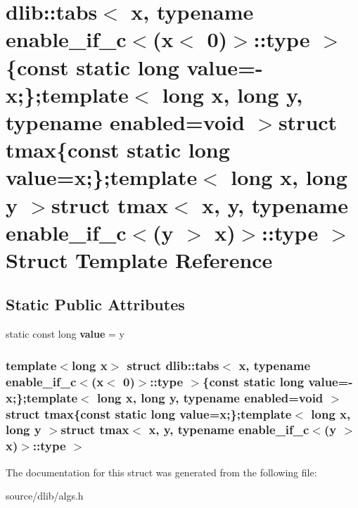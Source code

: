 \hypertarget{structdlib_1_1tabs_3_01x_00_01typename_01enable__if__c_3_07x_3_010_08_4_1_1type_01_4_02const_01s5583e8a7aa9817e380d6b80c74f287b0}{
\section{dlib::tabs$<$ x, typename enable\_\-if\_\-c$<$(x$<$ 0)$>$::type $>$\{const static long value=-\/x;\};template$<$ long x, long y, typename enabled=void $>$struct tmax\{const static long value=x;\};template$<$ long x, long y $>$struct tmax$<$ x, y, typename enable\_\-if\_\-c$<$(y $>$ x)$>$::type $>$ Struct Template Reference}
\label{structdlib_1_1tabs_3_01x_00_01typename_01enable__if__c_3_07x_3_010_08_4_1_1type_01_4_02const_01s5583e8a7aa9817e380d6b80c74f287b0}
}
\subsection*{Static Public Attributes}
\begin{DoxyCompactItemize}
\item 
\hypertarget{structdlib_1_1tabs_3_01x_00_01typename_01enable__if__c_3_07x_3_010_08_4_1_1type_01_4_02const_01s5583e8a7aa9817e380d6b80c74f287b0_a51dbbdc71ec5aecb391194f232164d98}{
static const long {\bfseries value} = y}
\label{structdlib_1_1tabs_3_01x_00_01typename_01enable__if__c_3_07x_3_010_08_4_1_1type_01_4_02const_01s5583e8a7aa9817e380d6b80c74f287b0_a51dbbdc71ec5aecb391194f232164d98}

\end{DoxyCompactItemize}
\subsubsection*{template$<$long x$>$ struct dlib::tabs$<$ x, typename enable\_\-if\_\-c$<$(x$<$ 0)$>$::type $>$\{const static long value=-\/x;\};template$<$ long x, long y, typename enabled=void $>$struct tmax\{const static long value=x;\};template$<$ long x, long y $>$struct tmax$<$ x, y, typename enable\_\-if\_\-c$<$(y $>$ x)$>$::type $>$}



The documentation for this struct was generated from the following file:\begin{DoxyCompactItemize}
\item 
source/dlib/algs.h\end{DoxyCompactItemize}
